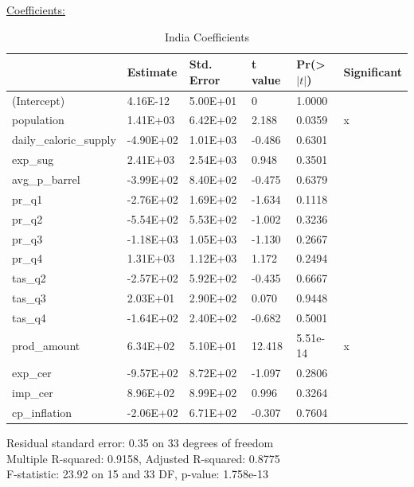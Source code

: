 \documentclass[11pt]{article}
\begin{document}
\underline{Coefficients:}
\FloatBarrier
\begin{table}[!htbp]
\centering
\begin{tabular}{llllll}
\hline
                       & Estimate  & Std. Error & t value & Pr(\textgreater$|t|$) & Significant \\ \hline
(Intercept)            & 4.16E-12  & 5.00E+01   & 0       & 1.0000              &             \\
population             & 1.41E+03  & 6.42E+02   & 2.188   & 0.0359              & x           \\
daily\_caloric\_supply & -4.90E+02 & 1.01E+03   & -0.486  & 0.6301              &             \\
exp\_sug               & 2.41E+03  & 2.54E+03   & 0.948   & 0.3501              &             \\
avg\_p\_barrel         & -3.99E+02 & 8.40E+02   & -0.475  & 0.6379              &             \\
pr\_q1                 & -2.76E+02 & 1.69E+02   & -1.634  & 0.1118              &             \\
pr\_q2                 & -5.54E+02 & 5.53E+02   & -1.002  & 0.3236              &             \\
pr\_q3                 & -1.18E+03 & 1.05E+03   & -1.130  & 0.2667              &             \\
pr\_q4                 & 1.31E+03  & 1.12E+03   & 1.172   & 0.2494              &             \\
tas\_q2                & -2.57E+02 & 5.92E+02   & -0.435  & 0.6667              &             \\
tas\_q3                & 2.03E+01  & 2.90E+02   & 0.070   & 0.9448              &             \\
tas\_q4                & -1.64E+02 & 2.40E+02   & -0.682  & 0.5001              &             \\
prod\_amount           & 6.34E+02  & 5.10E+01   & 12.418  & 5.51e-14            & x           \\
exp\_cer               & -9.57E+02 & 8.72E+02   & -1.097  & 0.2806              &             \\
imp\_cer               & 8.96E+02  & 8.99E+02   & 0.996   & 0.3264              &             \\
cp\_inflation          & -2.06E+02 & 6.71E+02   & -0.307  & 0.7604              &            \\ \hline
\end{tabular}
\caption{India Coefficients}
\label{table14}
\end{table}
\FloatBarrier
Residual standard error: 0.35 on 33 degrees of freedom \\
Multiple R-squared:  0.9158,	Adjusted R-squared:  0.8775 \\ 
F-statistic: 23.92 on 15 and 33 DF,  p-value: 1.758e-13
\end{document}
